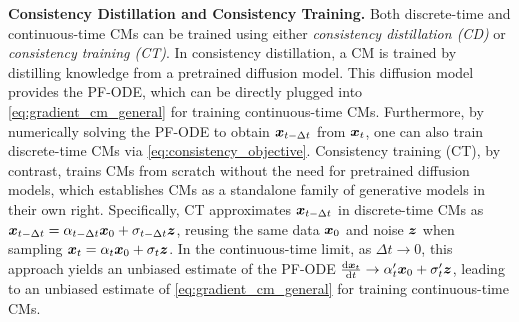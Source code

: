 \textbf{Consistency Distillation and Consistency Training. }
Both discrete-time and continuous-time CMs can be trained using either \emph{consistency distillation (CD)} or \emph{consistency training (CT)}. In consistency distillation, a CM is trained by distilling knowledge from a pretrained diffusion model. This diffusion model provides the PF-ODE, which can be directly plugged into \eqref{eq:gradient_cm_general} for training continuous-time CMs. Furthermore, by numerically solving the PF-ODE to obtain ${\bm{x}}_{t-\Delta t}$ from ${\bm{x}}_t$, one can also train discrete-time CMs via \eqref{eq:consistency_objective}. Consistency training (CT), by contrast, trains CMs from scratch without the need for pretrained diffusion models, which establishes CMs as a standalone family of generative models in their own right. Specifically, CT approximates ${\bm{x}}_{t-\Delta t}$ in discrete-time CMs as ${\bm{x}}_{t-\Delta t} = \alpha_{t-\Delta t} {\bm{x}}_0 + \sigma_{t-\Delta t} {\bm{z}}$, reusing the same data ${\bm{x}}_0$ and noise ${\bm{z}}$ when sampling ${\bm{x}}_t = \alpha_t {\bm{x}}_0 + \sigma_t {\bm{z}}$. In the continuous-time limit, as $\Delta t\to 0$, this approach yields an unbiased estimate of the PF-ODE $\frac{\mathrm{d} {\bm{x}}_t}{\mathrm{d} t} \to \alpha_t' {\bm{x}}_0 + \sigma_t' {\bm{z}}$, leading to an unbiased estimate of \eqref{eq:gradient_cm_general} for training continuous-time CMs.











